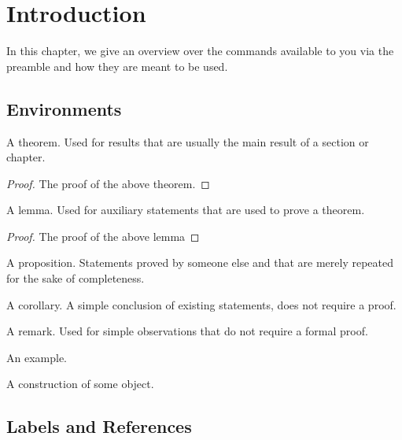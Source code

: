 \chapter{Introduction}\label{introduction}

In this chapter, we give an overview over the commands available to you via the preamble and how they are meant to be used.

\section{Environments}\label{introduction:environments}

\begin{theorem}
A theorem. Used for results that are usually the main result of a section or chapter.
\end{theorem}

\begin{proof}
The proof of the above theorem.	
\end{proof}


\begin{lemma}
A lemma. Used for auxiliary statements that are used to prove a theorem.
\end{lemma}

\begin{proof}
The proof of the above lemma	
\end{proof}


\begin{proposition}
A proposition. Statements proved by someone else and that are merely repeated for the sake of completeness.
\end{proposition}

\begin{corollary}
A corollary. A simple conclusion of existing statements, does not require a proof.
\end{corollary}

\begin{remark}
A remark. Used for simple observations that do not require a formal proof.	
\end{remark}

\begin{example}
An example.	
\end{example}

\begin{construction}
A construction of some object.
\end{construction}

\section{Labels and References}

